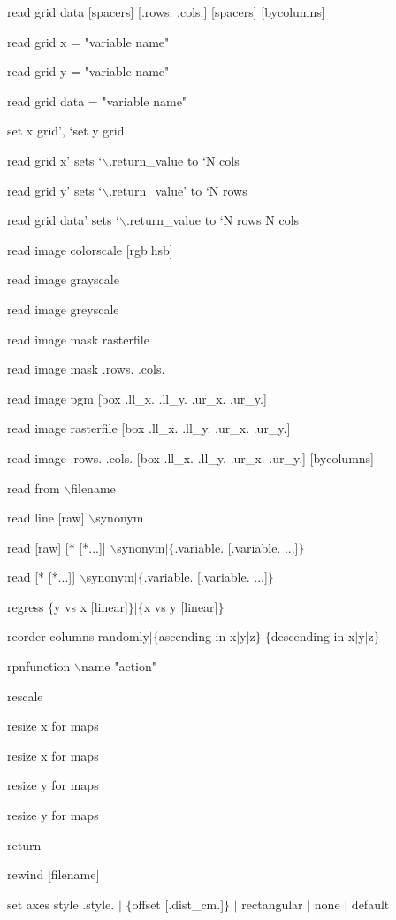 read grid data [spacers] [.rows. .cols.] [spacers] [bycolumns]

read grid x = "variable name"

read grid y = "variable name"

read grid data = "variable name"

set x grid', `set y grid

read grid x' sets `$\backslash$.return\_value to `N cols

read grid y' sets `$\backslash$.return\_value' to `N rows

read grid data' sets `$\backslash$.return\_value to `N rows N cols

read image colorscale [rgb$\mid$hsb]

read image grayscale

read image greyscale

read image mask rasterfile

read image mask .rows. .cols.

read image pgm [box .ll\_x. .ll\_y. .ur\_x. .ur\_y.]

read image rasterfile [box .ll\_x. .ll\_y. .ur\_x. .ur\_y.]

read image .rows. .cols. [box .ll\_x. .ll\_y. .ur\_x. .ur\_y.] [bycolumns]

read from $\backslash$filename

read line [raw] $\backslash$synonym

read [raw] [* [*...]] $\backslash$synonym$\mid$$\lbrace$.variable. [.variable. ...]$\rbrace$

read [* [*...]] $\backslash$synonym$\mid$$\lbrace$.variable. [.variable. ...]$\rbrace$

regress $\lbrace$y vs x [linear]$\rbrace$$\mid$$\lbrace$x vs y [linear]$\rbrace$

reorder columns randomly$\mid$$\lbrace$ascending in x$\mid$y$\mid$z$\rbrace$$\mid$$\lbrace$descending in x$\mid$y$\mid$z$\rbrace$

rpnfunction $\backslash$name "action"

rescale

resize x for maps

resize x for maps

resize y for maps

resize y for maps

return

rewind [filename]

set axes style .style. $\mid$ $\lbrace$offset [.dist\_cm.]$\rbrace$ $\mid$ rectangular $\mid$ none $\mid$ default

